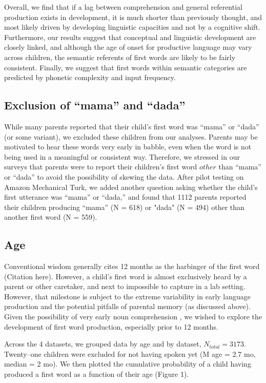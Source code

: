 \documentclass[10pt,letterpaper]{article}
\begin{document}
Overall, we find that if a lag between comprehension and general referential production exists in development, it is much shorter than previously thought, and most likely driven by developing linguistic capacities and not by a cognitive shift. Furthermore, our results suggest that conceptual and linguistic development are closely linked, and although the age of onset for productive language may vary across children, the semantic referents of first words are likely to be fairly consistent. Finally, we suggest that first words within semantic categories are predicted by phonetic complexity and input frequency. 

\subsection{Exclusion of ``mama'' and ``dada''}
While many parents reported that their child's first word was ``mama'' or ``dada'' (or some variant), we excluded these children from our analyses. Parents may be motivated to hear these words very early in babble, even when the word is not being used in a meaningful or consistent way. Therefore, we stressed in our surveys that parents were to report their children's first word $other$ than ``mama'' or ``dada'' to avoid the possibility of skewing the data. After pilot testing on Amazon Mechanical Turk, we added another question asking whether the child's first utterance was ``mama'' or ``dada,'' and found that 1112 parents reported their children producing ``mama'' (N = 618) or "dada" (N = 494) other than another first word (N = 559). 

\subsection{Age} 

Conventional wisdom generally cites 12 months as the harbinger of the first word (Citation here). However, a child's first word is almost exclusively heard by a parent or other caretaker, and next to impossible to capture in a lab setting. However, that milestone is subject to the extreme variability in early language production \cite{fenson1994} and the potential pitfalls of parental memory (as discussed above). Given the possibility of very early noun comprehension \cite{tincoff1999,tincoff2012,bergelson2012}, we wished to explore the development of first word production, especially prior to 12 months.

Across the 4 datasets, we grouped data by age and by dataset, $N_{total} = 3173$. Twenty--one children were excluded for not having spoken yet (M age = 2.7 mo, median = 2 mo). We then plotted the cumulative probability of a child having produced a first word as a function of their age (Figure 1).
\end{document}
